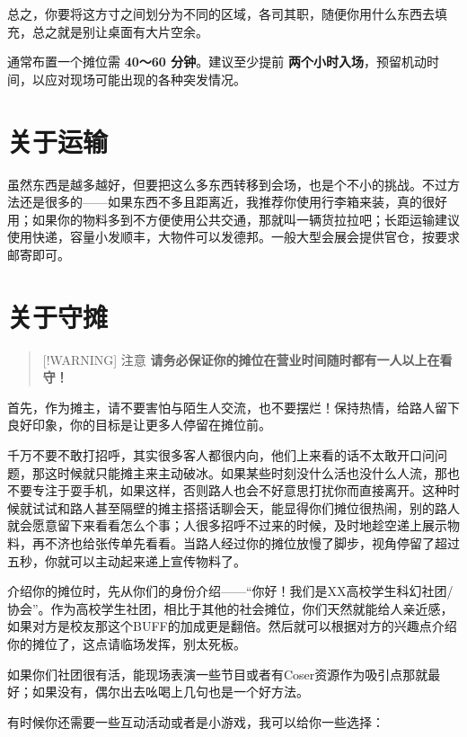 总之，你要将这方寸之间划分为不同的区域，各司其职，随便你用什么东西去填充，总之就是别让桌面有大片空余。

通常布置一个摊位需 \textbf{40～60 分钟}。建议至少提前
\textbf{两个小时入场}，预留机动时间，以应对现场可能出现的各种突发情况。

\section{关于运输}\label{ux5173ux4e8eux8fd0ux8f93}

虽然东西是越多越好，但要把这么多东西转移到会场，也是个不小的挑战。不过方法还是很多的------如果东西不多且距离近，我推荐你使用行李箱来装，真的很好用；如果你的物料多到不方便使用公共交通，那就叫一辆货拉拉吧；长距运输建议使用快递，容量小发顺丰，大物件可以发德邦。一般大型会展会提供官仓，按要求邮寄即可。

\section{关于守摊}\label{ux5173ux4e8eux5b88ux644a}

\begin{quote}
{[}!WARNING{]} 注意
\textbf{请务必保证你的摊位在营业时间随时都有一人以上在看守！}
\end{quote}

首先，作为摊主，请不要害怕与陌生人交流，也不要摆烂！保持热情，给路人留下良好印象，你的目标是让更多人停留在摊位前。

千万不要不敢打招呼，其实很多客人都很内向，他们上来看的话不太敢开口问问题，那这时候就只能摊主来主动破冰。如果某些时刻没什么活也没什么人流，那也不要专注于耍手机，如果这样，否则路人也会不好意思打扰你而直接离开。这种时候就试试和路人甚至隔壁的摊主搭搭话聊会天，能显得你们摊位很热闹，别的路人就会愿意留下来看看怎么个事；人很多招呼不过来的时候，及时地趁空递上展示物料，再不济也给张传单先看看。当路人经过你的摊位放慢了脚步，视角停留了超过五秒，你就可以主动起来递上宣传物料了。

介绍你的摊位时，先从你们的身份介绍------``你好！我们是XX高校学生科幻社团/协会''。作为高校学生社团，相比于其他的社会摊位，你们天然就能给人亲近感，如果对方是校友那这个BUFF的加成更是翻倍。然后就可以根据对方的兴趣点介绍你的摊位了，这点请临场发挥，别太死板。

如果你们社团很有活，能现场表演一些节目或者有Coser资源作为吸引点那就最好；如果没有，偶尔出去吆喝上几句也是一个好方法。

有时候你还需要一些互动活动或者是小游戏，我可以给你一些选择：


